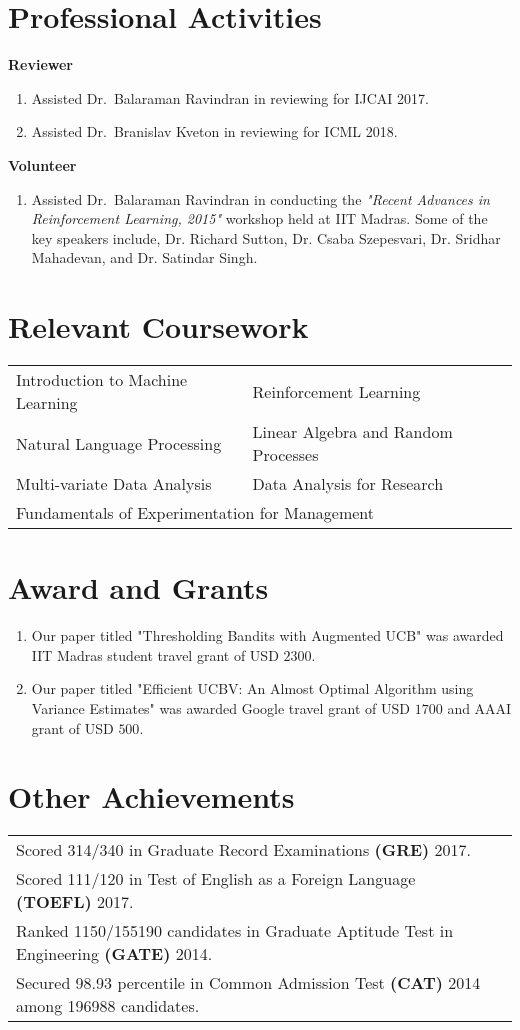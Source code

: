 \documentclass[margin,11pt]{res}
\begin{document}
\begin{resume}
\section{Professional Activities}
\textbf{Reviewer} 
\begin{enumerate}
\item Assisted Dr.~Balaraman Ravindran in reviewing for IJCAI 2017.
\item Assisted Dr.~Branislav Kveton in reviewing for ICML 2018.
\end{enumerate}

\textbf{Volunteer} 
\begin{enumerate}
\item Assisted Dr.~Balaraman Ravindran in conducting the \textit{"Recent Advances in Reinforcement Learning, 2015"} workshop held at IIT Madras. Some of the key speakers include, Dr. Richard Sutton, Dr. Csaba Szepesvari, Dr. Sridhar Mahadevan, and Dr. Satindar Singh.
\end{enumerate}


\section{Relevant Coursework}
\begin{tabular}{ll}
Introduction to Machine Learning & Reinforcement Learning  \\
Natural Language Processing & Linear Algebra and Random Processes \\
Multi-variate Data Analysis & Data Analysis for Research \\
\multicolumn{2}{l}{Fundamentals of Experimentation for Management}
\end{tabular}

\section{Award and Grants}
\begin{enumerate}
\item Our paper titled "Thresholding Bandits with Augmented UCB" was awarded IIT Madras student travel grant of USD $2300$.
\item Our paper titled "Efficient UCBV: An Almost Optimal Algorithm using Variance Estimates" was awarded Google travel grant of USD $1700$ and AAAI grant of USD $500$.
\end{enumerate}


\section{Other Achievements}
\begin{tabular}{p{12cm}p{80cm}}
Scored 314/340 in Graduate Record Examinations \textbf{(GRE)} 2017.\\
Scored 111/120 in Test of English as a Foreign Language \textbf{(TOEFL)} 2017.\\
Ranked 1150/155190 candidates in Graduate Aptitude Test in Engineering \textbf{(GATE)} 2014. \\
Secured 98.93 percentile in Common Admission Test \textbf{(CAT)} 2014 among 196988 candidates.
\end{tabular}


\end{resume}
\end{document}
